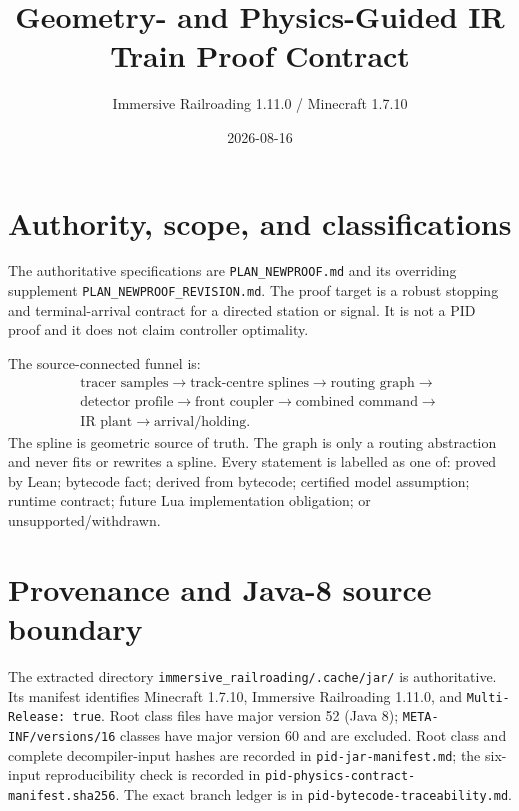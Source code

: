 \documentclass[10pt,a4paper]{article}
\title{Geometry- and Physics-Guided IR Train Proof Contract}
\author{Immersive Railroading 1.11.0 / Minecraft 1.7.10}
\date{2026-08-16}
\newcommand{\bytecode}{\textsf{bytecode fact}}
\newcommand{\derived}{\textsf{derived from bytecode}}
\newcommand{\model}{\textsf{certified model assumption}}
\newcommand{\runtime}{\textsf{runtime contract}}
\newcommand{\obligation}{\textsf{future Lua implementation obligation}}
\begin{document}
\sloppy
\setlength{\tabcolsep}{2pt}
\setlength{\emergencystretch}{3em}
\hfuzz=100pt
\maketitle

\begin{center}
\end{center}

\tableofcontents

\section{Authority, scope, and classifications}

The authoritative specifications are \texttt{PLAN\_NEWPROOF.md} and its
overriding supplement \texttt{PLAN\_NEWPROOF\_REVISION.md}. The proof target
is a robust stopping and terminal-arrival contract for a directed station or
signal. It is not a PID proof and it does not claim controller optimality.

The source-connected funnel is:
\[
 \begin{gathered}
 \text{tracer samples}\to\text{track-centre splines}\to\text{routing graph}\to\\
 \text{detector profile}\to\text{front coupler}\to\text{combined command}\to\\
 \text{IR plant}\to\text{arrival/holding}.
 \end{gathered}
\]
The spline is geometric source of truth. The graph is only a routing
abstraction and never fits or rewrites a spline. Every statement is labelled
as one of: proved by Lean; \bytecode; \derived; \model; \runtime;
\obligation; or unsupported/withdrawn.

\section{Provenance and Java-8 source boundary}

The extracted directory \texttt{immersive\_railroading/.cache/jar/} is
authoritative. Its manifest identifies Minecraft 1.7.10, Immersive Railroading
1.11.0, and \texttt{Multi-Release: true}. Root class files have major version
52 (Java 8); \texttt{META-INF/versions/16} classes have major version 60 and
are excluded. Root class and complete decompiler-input hashes are recorded in
\texttt{pid-jar-manifest.md}; the six-input reproducibility check is recorded
in \texttt{pid-physics-contract-manifest.sha256}. The exact branch ledger is
in \texttt{pid-bytecode-traceability.md}.
\end{document}
